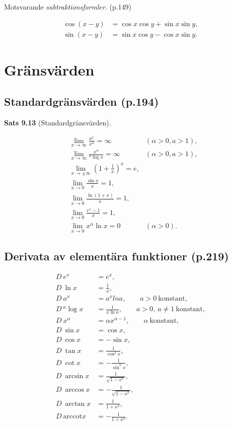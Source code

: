 \documentclass[11pt]{article}
\begin{document}
Motsvarande \textit{subtraktionsformler}. (p.149)

\begin{align}
    \cos(x - y) &= \cos x \cos y + \sin x \sin y,\\
    \sin(x - y) &= \sin x \cos y - \cos x \sin y.
\end{align}

\section{Gränsvärden}

\subsection{Standardgränsvärden (p.194)}

\textbf{Sats 9.13} (Standardgränsvärden).

\begin{align}
    &\lim_{x \to \infty} \frac{a^x}{x^\alpha} = \infty \quad &(\alpha > 0, a > 1),\\
    &\lim_{x \to \infty} \frac{x^\alpha}{{}^a\log x} = \infty \quad &(\alpha > 0, a > 1),\\
    &\lim_{x \to \pm \infty} \left( 1 + \frac{1}{x} \right)^x = e,\\
    &\lim_{x \to 0} \frac{\sin x}{x} = 1,\\
    &\lim_{x \to 0} \frac{\ln(1 + x)}{x} = 1,\\
    &\lim_{x \to 0} \frac{e^x - 1}{x} = 1,\\
    &\lim_{x \to 0} x^\alpha \ln x = 0 \quad &(\alpha > 0).
\end{align}

\subsection{Derivata av elementära funktioner (p.219)}

\begin{align}
    D\ e^x &= e^x,\\
    D\ \ln x &= \frac{1}{x},\\
    D\ a^x &= a^x ln a, \qquad a > 0\ \mathrm{konstant},\\
    D\ {}^{a}\log x &= \frac{1}{x \ln a}, \qquad a > 0,\ a \neq 1\ \mathrm{konstant},\\
    D\ x^\alpha &= \alpha x^{\alpha - 1}, \qquad \alpha\ \mathrm{konstant},\\
    D\ \sin x &= \cos x,\\
    D\ \cos x &= -\sin x,\\
    D\ \tan x &= \frac{1}{\cos^2 x},\\
    D\ \cot x &= -\frac{1}{\sin^2 x},\\
    D\ \arcsin x &= \frac{1}{\sqrt{1 - x^x}},\\
    D\ \arccos x &= -\frac{1}{\sqrt{1 - x^2}},\\
    D\ \arctan x &= \frac{1}{1 + x^2},\\
    D\ \mathrm{arccot} x &= -\frac{1}{1 + x^2}.
\end{align}
\end{document}
